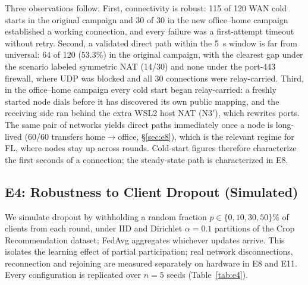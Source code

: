 \documentclass[a4paper,fleqn]{cas-dc}
\begin{document}
Three observations follow. First, connectivity is robust: 115 of 120 WAN cold starts in the original campaign and 30 of 30 in the new office--home campaign established a working connection, and every failure was a first-attempt timeout without retry. Second, a validated direct path within the 5~s window is far from universal: 64 of 120 (53.3\%) in the original campaign, with the clearest gap under the scenario labeled symmetric NAT (14/30) and none under the port-443 firewall, where UDP was blocked and all 30 connections were relay-carried. Third, in the office--home campaign every cold start began relay-carried: a freshly started node dials before it has discovered its own public mapping, and the receiving side ran behind the extra WSL2 host NAT (N3$'$), which rewrites ports. The same pair of networks yields direct paths immediately once a node is long-lived (60/60 transfers home$\to$office, \S\ref{sec:e8}), which is the relevant regime for FL, where nodes stay up across rounds. Cold-start figures therefore characterize the first seconds of a connection; the steady-state path is characterized in E8.

\subsection{E4: Robustness to Client Dropout (Simulated)}
\label{sec:e4}

We simulate dropout by withholding a random fraction $p \in \{0, 10, 30, 50\}$\% of clients from each round, under IID and Dirichlet $\alpha{=}0.1$ partitions of the Crop Recommendation dataset; FedAvg aggregates whichever updates arrive. This isolates the learning effect of partial participation; real network disconnections, reconnection and rejoining are measured separately on hardware in E8 and E11. Every configuration is replicated over $n{=}5$ seeds (Table~\ref{tab:e4}).
\end{document}
